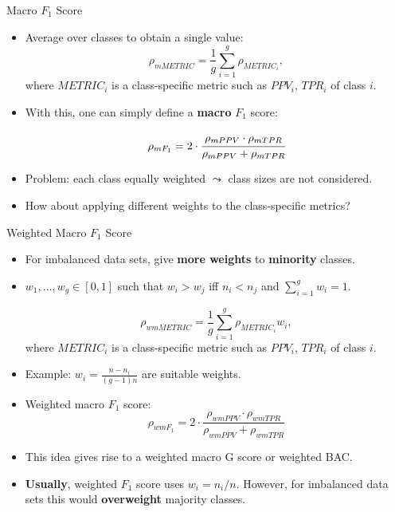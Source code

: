 \documentclass[11pt,compress,t,notes=noshow, xcolor=table]{beamer}
\begin{document}
\begin{frame}{Macro $F_1$ Score}
	
	\small{

    	\begin{itemize}
    
    		\item Average over classes to obtain a single value:
            $$\rho_{mMETRIC} = \frac{1}{g}\sum_{i=1}^g \rho_{METRIC_i},$$
            where $METRIC_i$ is a class-specific metric such as $PPV_i$, $TPR_i$ of class $i$.
    		
    	
    		\item With this, one can simply define a \textbf{macro} $F_1$ score:
    	
    		$$\rho_{mF_1} = 2 \cdot \cfrac{\rho_{mPPV} \cdot \rho_{mTPR}}{\rho_{mPPV} + 
    			\rho_{mTPR}}$$
    
    		\item Problem: each class equally weighted $\leadsto$ class sizes are not considered.
    
            \item How about applying different weights to the class-specific metrics?

    	\end{itemize}
	}
\end{frame}

\begin{frame}{Weighted Macro $F_1$ Score}

	\small{

    	\begin{itemize}
    
    		\item For imbalanced data sets, give \textbf{more weights} to \textbf{minority} classes.
      
            \item $w_1,\ldots,w_g \in[0,1]$  such that $w_i > w_j$ iff $n_i < n_j$ and $\sum_{i=1}^g w_i = 1.$
    
            $$\rho_{wmMETRIC} = \frac{1}{g}\sum_{i=1}^g \rho_{METRIC_i} w_i,$$
            where $METRIC_i$ is a class-specific metric such as $PPV_i$, $TPR_i$ of class $i$.
    	 
    		\item Example: $w_i = \frac{n - n_i}{(g-1)n}$ are suitable weights.
    
    		\item Weighted macro $F_1$ score:	
    		$$\rho_{wmF_1} = 2 \cdot \frac{\rho_{wmPPV} \cdot \rho_{wmTPR}}{\rho_{wmPPV} + \rho_{wmTPR}}$$
      
    		\item This idea gives rise to a weighted macro G score or weighted BAC.
    	
    		\item \textbf{Usually}, weighted $F_1$ score uses $w_i = n_i/n$. However, for imbalanced data sets this would \textbf{overweight} majority classes.
    
    	\end{itemize}
	}
\end{frame}
\end{document}
